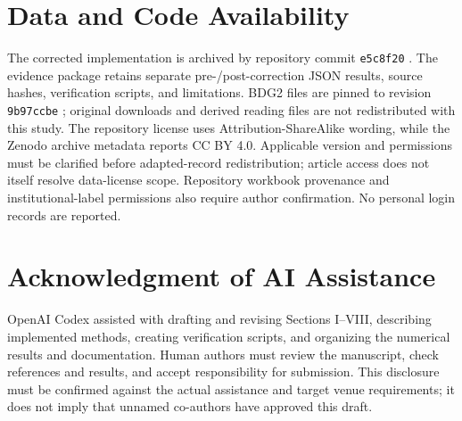 \documentclass[conference]{IEEEtran}
\begin{document}
\section*{Data and Code Availability}
The corrected implementation is archived by repository commit \texttt{e5c8f20} \cite{repository}. The evidence package retains separate pre-/post-correction JSON results, source hashes, verification scripts, and limitations. BDG2 files are pinned to revision \texttt{9b97ccbe} \cite{bdgsource}; original downloads and derived reading files are not redistributed with this study. The repository license uses Attribution-ShareAlike wording, while the Zenodo archive metadata reports CC BY 4.0. Applicable version and permissions must be clarified before adapted-record redistribution; article access does not itself resolve data-license scope. Repository workbook provenance and institutional-label permissions also require author confirmation. No personal login records are reported.

\section*{Acknowledgment of AI Assistance}
OpenAI Codex assisted with drafting and revising Sections I--VIII, describing implemented methods, creating verification scripts, and organizing the numerical results and documentation. Human authors must review the manuscript, check references and results, and accept responsibility for submission. This disclosure must be confirmed against the actual assistance and target venue requirements; it does not imply that unnamed co-authors have approved this draft.
\end{document}
